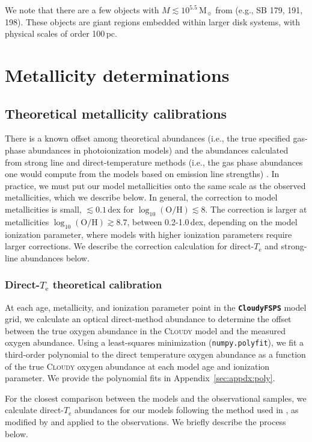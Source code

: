 \documentclass[trackchanges, preprint2]{aastex62}
\newcommand{\CloudyFSPS}{{\tt \textbf{CloudyFSPS}}\xspace}
\newcommand{\Cloudy}{\textsc{Cloudy}\xspace}
\newcommand{\hii}{\ion{H}{2}}
\newcommand\Msun{\ensuremath{\mathrm{M_{\sun}}}\xspace}
\newcommand{\logten}{\ensuremath{\log_{10}}}
\newcommand{\logOH}{\ensuremath{\logten (\mathrm{O}/\mathrm{H})}\xspace}
\newcommand{\Te}{\ensuremath{T_{\mathrm{e}}}\xspace}
\begin{document}
We note that there are a few objects with $M \lesssim 10^{5.5}$\,\Msun from \citet{Senchyna+2017} (e.g., SB 179, 191, 198). These objects are giant \hii{} regions embedded within larger disk systems, with physical scales of order 100\,pc.


\section{Metallicity determinations}\label{sec:Z}

\subsection{Theoretical metallicity calibrations}\label{sec:Z:corr}

There is a known offset among theoretical abundances (i.e., the true specified gas-phase abundances in photoionization models) and the abundances calculated from strong line and direct-temperature methods (i.e., the gas phase abundances one would compute from the models based on emission line strengths) \citep[e.g.,][]{Kewley+2008}. In practice, we must put our model metallicities onto the same scale as the observed metallicities, which we describe below. In general, the correction to model metallicities is small, $\lesssim 0.1$\,dex for \logOH$ \lesssim 8$. The correction is larger at metallicities \logOH$\gtrsim 8.7$, between 0.2-1.0\,dex, depending on the model ionization parameter, where models with higher ionization parameters require larger corrections. We describe the correction calculation for direct-\Te and strong-line abundances below.

\subsubsection{Direct-\Te theoretical calibration}\label{sec:Z:corr:Te}

At each age, metallicity, and ionization parameter point in the \CloudyFSPS model grid, we calculate an optical direct-method abundance to determine the offset between the true oxygen abundance in the \Cloudy model and the measured oxygen abundance. Using a least-squares minimization ({\tt numpy.polyfit}), we fit a third-order polynomial to the direct temperature oxygen abundance as a function of the true \Cloudy oxygen abundance at each model age and ionization parameter. We provide the polynomial fits in Appendix~\ref{sec:appdx:poly}.

For the closest comparison between the models and the observational samples, we calculate direct-\Te abundances for our models following the method used in \citet{Garnett+1992}, as modified by \citet{Berg+2015} and applied to the \citet{Berg+2016} observations. We briefly describe the process below.
\end{document}
